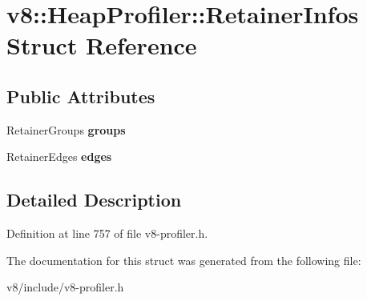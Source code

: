 \hypertarget{structv8_1_1HeapProfiler_1_1RetainerInfos}{}\section{v8\+:\+:Heap\+Profiler\+:\+:Retainer\+Infos Struct Reference}
\label{structv8_1_1HeapProfiler_1_1RetainerInfos}
\subsection*{Public Attributes}
\begin{DoxyCompactItemize}
\item 
\mbox{\label{structv8_1_1HeapProfiler_1_1RetainerInfos_ac955e4c7a262b0d374e70d6229d5b672}} 
Retainer\+Groups {\bfseries groups}
\item 
\mbox{\label{structv8_1_1HeapProfiler_1_1RetainerInfos_a30a98dbe97c3b3462f1737e15debaedc}} 
Retainer\+Edges {\bfseries edges}
\end{DoxyCompactItemize}


\subsection{Detailed Description}


Definition at line 757 of file v8-\/profiler.\+h.



The documentation for this struct was generated from the following file\+:\begin{DoxyCompactItemize}
\item 
v8/include/v8-\/profiler.\+h\end{DoxyCompactItemize}
